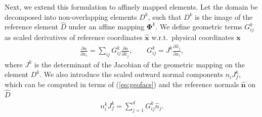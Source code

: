 \documentclass[review]{siamart0216}
\theoremstyle{assumption}
\renewcommand{\hat}[1]{\hat{#1}}
\newcommand{\pd}[2]{\frac{\partial#1}{\partial#2}}
\renewcommand{\hat}{\widehat}
\begin{document}
Next, we extend this formulation to affinely mapped elements.  Let the domain be decomposed into non-overlapping elements $D^k$, such that $D^k$ is the image of the reference element $\hat{D}$ under an affine mapping $\bm{\Phi}^k$.  We define geometric terms ${G}^k_{ij}$ as scaled derivatives of reference coordinates $\hat{\bm{x}}$ w.r.t.\ physical coordinates $\bm{x}$
\begin{gather}
\pd{u}{x_i} = \sum_{ij} {G}^k_{ij}\pd{u}{\hat{x}_j}, \qquad {G}^k_{ij} = J^k\pd{\hat{x}_j}{{x}_i}, 
\label{eq:geofacs}
\end{gather}
where $J^k$ is the determinant of the Jacobian of the geometric mapping on the element $D^k$.  We also introduce the scaled outward normal components $n_iJ^k_f$, which can be computed in terms of (\ref{eq:geofacs}) and the reference normals $\hat{\bm{n}}$ on $\hat{D}$
\begin{gather}
n^k_i J^k_f = \sum_{j=1}^d G^k_{ij} \hat{{n}}_j.  
\label{eq:normals}
\end{gather}
 
\end{document}
